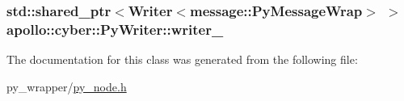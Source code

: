 \hypertarget{classapollo_1_1cyber_1_1PyWriter_a668e689aec284bf889f8df72eaa078b8}{
\subsubsection[{writer\-\_\-}]{\setlength{\rightskip}{0pt plus 5cm}std\-::shared\-\_\-ptr$<${\bf Writer}$<${\bf message\-::\-Py\-Message\-Wrap}$>$ $>$ apollo\-::cyber\-::\-Py\-Writer\-::writer\-\_\-\hspace{0.3cm}{\ttfamily [private]}}}\label{classapollo_1_1cyber_1_1PyWriter_a668e689aec284bf889f8df72eaa078b8}


The documentation for this class was generated from the following file\-:\begin{DoxyCompactItemize}
\item 
py\-\_\-wrapper/\hyperlink{py__node_8h}{py\-\_\-node.\-h}\end{DoxyCompactItemize}
